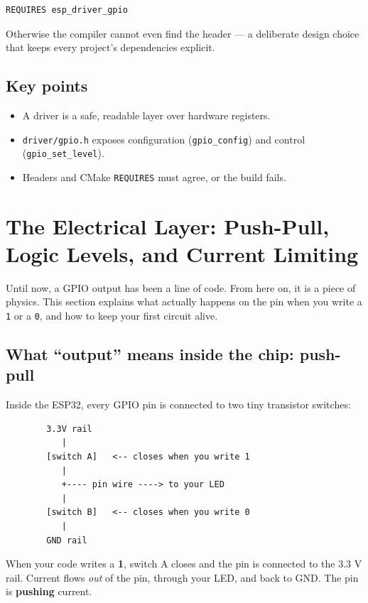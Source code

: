 \documentclass[11pt]{article}
\begin{document}
\begin{verbatim}
REQUIRES esp_driver_gpio
\end{verbatim}

Otherwise the compiler cannot even find the header --- a deliberate design choice that keeps every project's dependencies explicit.

\subsection{Key points}

\begin{itemize}
    \item A driver is a safe, readable layer over hardware registers.
    \item \texttt{driver/gpio.h} exposes configuration (\texttt{gpio\_config}) and control (\texttt{gpio\_set\_level}).
    \item Headers and CMake \texttt{REQUIRES} must agree, or the build fails.
\end{itemize}
\section{The Electrical Layer: Push-Pull, Logic Levels, and Current Limiting}

Until now, a GPIO output has been a line of code. From here on, it is a piece of physics. This section explains what actually happens on the pin when you write a \texttt{1} or a \texttt{0}, and how to keep your first circuit alive.

\subsection{What ``output'' means inside the chip: push-pull}

Inside the ESP32, every GPIO pin is connected to two tiny transistor switches:

\begin{verbatim}
        3.3V rail
           |
        [switch A]   <-- closes when you write 1
           |
           +---- pin wire ----> to your LED
           |
        [switch B]   <-- closes when you write 0
           |
        GND rail
\end{verbatim}

When your code writes a \textbf{1}, switch A closes and the pin is connected to the 3.3 V rail. Current flows \emph{out} of the pin, through your LED, and back to GND. The pin is \textbf{pushing} current.
\end{document}
